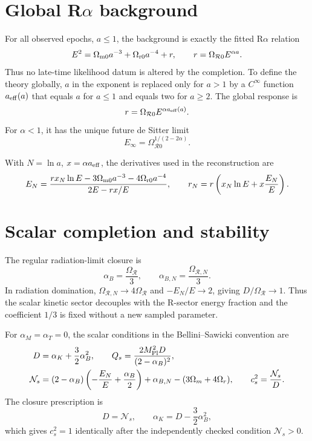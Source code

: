 \documentclass[11pt,a4paper]{article}
\newcommand{\Mpl}{M_{\rm Pl}}
\begin{document}
\section{Global R$\alpha$ background}

For all observed epochs, $a\le1$, the background is exactly the fitted R$\alpha$ relation
\begin{equation}
E^2=\Omega_{\rm m0}a^{-3}+\Omega_{\rm r0}a^{-4}+r,
\qquad r=\Omega_{\mathcal R0}E^{\alpha a}.
\label{eq:observed-background}
\end{equation}
Thus no late-time likelihood datum is altered by the completion. To define the theory globally, $a$ in the exponent is replaced only for $a>1$ by a $C^\infty$ function $a_{\rm eff}(a)$ that equals $a$ for $a\le1$ and equals two for $a\ge2$. The global response is
\begin{equation}
r=\Omega_{\mathcal R0}E^{\alpha a_{\rm eff}(a)}.
\label{eq:global-background}
\end{equation}
For $\alpha<1$, it has the unique future de Sitter limit
\begin{equation}
E_\infty=\Omega_{\mathcal R0}^{1/(2-2\alpha)}.
\end{equation}

With $N=\ln a$, $x=\alpha a_{\rm eff}$, the derivatives used in the reconstruction are
\begin{equation}
E_N=\frac{rx_N\ln E-3\Omega_{\rm m0}a^{-3}-4\Omega_{\rm r0}a^{-4}}{2E-rx/E},
\qquad r_N=r\left(x_N\ln E+x\frac{E_N}{E}\right).
\label{eq:background-derivatives}
\end{equation}

\section{Scalar completion and stability}

The regular radiation-limit closure is
\begin{equation}
\alpha_B=\frac{\Omega_{\mathcal R}}{3},\qquad
\alpha_{B,N}=\frac{\Omega_{\mathcal R,N}}{3}.
\label{eq:alphaB}
\end{equation}
In radiation domination, $\Omega_{\mathcal R,N}\to4\Omega_{\mathcal R}$ and $-E_N/E\to2$, giving $D/\Omega_{\mathcal R}\to1$. Thus the scalar kinetic sector decouples with the R-sector energy fraction and the coefficient $1/3$ is fixed without a new sampled parameter.

For $\alpha_M=\alpha_T=0$, the scalar conditions in the Bellini--Sawicki convention \citep{BelliniSawicki2014} are
\begin{align}
D&=\alpha_K+\frac32\alpha_B^2,\qquad
Q_s=\frac{2\Mpl^2D}{(2-\alpha_B)^2},\\
\mathcal N_s&=(2-\alpha_B)\left(-\frac{E_N}{E}+\frac{\alpha_B}{2}\right)+\alpha_{B,N}-(3\Omega_m+4\Omega_r),
\qquad c_s^2=\frac{\mathcal N_s}{D}.
\label{eq:scalar-stability}
\end{align}
The closure prescription is
\begin{equation}
D=\mathcal N_s,\qquad \alpha_K=D-\frac32\alpha_B^2,
\label{eq:closure}
\end{equation}
which gives $c_s^2=1$ identically after the independently checked condition $\mathcal N_s>0$.
\end{document}
